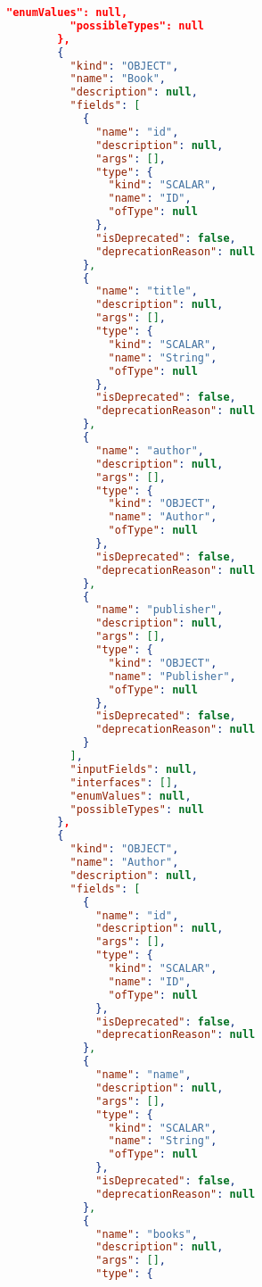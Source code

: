 \begin{lstlisting}[language=json]
          "enumValues": null,
          "possibleTypes": null
        },
        {
          "kind": "OBJECT",
          "name": "Book",
          "description": null,
          "fields": [
            {
              "name": "id",
              "description": null,
              "args": [],
              "type": {
                "kind": "SCALAR",
                "name": "ID",
                "ofType": null
              },
              "isDeprecated": false,
              "deprecationReason": null
            },
            {
              "name": "title",
              "description": null,
              "args": [],
              "type": {
                "kind": "SCALAR",
                "name": "String",
                "ofType": null
              },
              "isDeprecated": false,
              "deprecationReason": null
            },
            {
              "name": "author",
              "description": null,
              "args": [],
              "type": {
                "kind": "OBJECT",
                "name": "Author",
                "ofType": null
              },
              "isDeprecated": false,
              "deprecationReason": null
            },
            {
              "name": "publisher",
              "description": null,
              "args": [],
              "type": {
                "kind": "OBJECT",
                "name": "Publisher",
                "ofType": null
              },
              "isDeprecated": false,
              "deprecationReason": null
            }
          ],
          "inputFields": null,
          "interfaces": [],
          "enumValues": null,
          "possibleTypes": null
        },
        {
          "kind": "OBJECT",
          "name": "Author",
          "description": null,
          "fields": [
            {
              "name": "id",
              "description": null,
              "args": [],
              "type": {
                "kind": "SCALAR",
                "name": "ID",
                "ofType": null
              },
              "isDeprecated": false,
              "deprecationReason": null
            },
            {
              "name": "name",
              "description": null,
              "args": [],
              "type": {
                "kind": "SCALAR",
                "name": "String",
                "ofType": null
              },
              "isDeprecated": false,
              "deprecationReason": null
            },
            {
              "name": "books",
              "description": null,
              "args": [],
              "type": {

\end{lstlisting}
